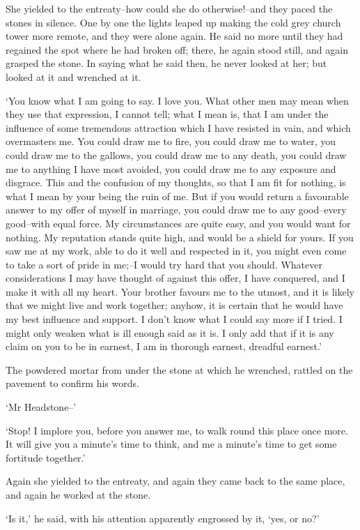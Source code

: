 She yielded to the entreaty--how could she do otherwise!--and they paced
the stones in silence. One by one the lights leaped up making the cold
grey church tower more remote, and they were alone again. He said no
more until they had regained the spot where he had broken off; there, he
again stood still, and again grasped the stone. In saying what he said
then, he never looked at her; but looked at it and wrenched at it.

‘You know what I am going to say. I love you. What other men may mean
when they use that expression, I cannot tell; what I mean is, that I am
under the influence of some tremendous attraction which I have resisted
in vain, and which overmasters me. You could draw me to fire, you could
draw me to water, you could draw me to the gallows, you could draw me to
any death, you could draw me to anything I have most avoided, you could
draw me to any exposure and disgrace. This and the confusion of my
thoughts, so that I am fit for nothing, is what I mean by your being the
ruin of me. But if you would return a favourable answer to my offer
of myself in marriage, you could draw me to any good--every good--with
equal force. My circumstances are quite easy, and you would want for
nothing. My reputation stands quite high, and would be a shield for
yours. If you saw me at my work, able to do it well and respected in
it, you might even come to take a sort of pride in me;--I would try hard
that you should. Whatever considerations I may have thought of against
this offer, I have conquered, and I make it with all my heart. Your
brother favours me to the utmost, and it is likely that we might live
and work together; anyhow, it is certain that he would have my best
influence and support. I don’t know what I could say more if I tried. I
might only weaken what is ill enough said as it is. I only add that
if it is any claim on you to be in earnest, I am in thorough earnest,
dreadful earnest.’

The powdered mortar from under the stone at which he wrenched, rattled
on the pavement to confirm his words.

‘Mr Headstone--’

‘Stop! I implore you, before you answer me, to walk round this place
once more. It will give you a minute’s time to think, and me a minute’s
time to get some fortitude together.’

Again she yielded to the entreaty, and again they came back to the same
place, and again he worked at the stone.

‘Is it,’ he said, with his attention apparently engrossed by it, ‘yes,
or no?’

